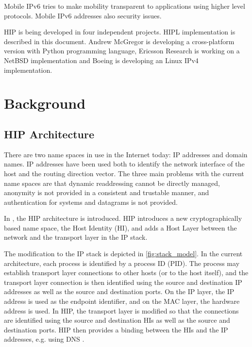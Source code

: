 Mobile IPv6 tries to make mobility transparent to applications using
higher level protocols. Mobile IPv6 \cite{rfc2002} addresses also
security issues.

HIP is being developed in four independent projects. HIPL
implementation is described in this document. Andrew McGregor is
developing a cross-platform version \cite{pyhip} with Python
programming language, Ericsson Research \cite{ericsson} is working on
a NetBSD implementation \cite{netbsd} and Boeing \cite{boeing} is
developing an Linux IPv4 implementation.

\section{Background}
\label{sec:background}

\subsection{HIP Architecture}

There are two name spaces in use in the Internet today: IP addresses
and domain names.  IP addresses have been used both to identify the
network interface of the host and the routing direction vector.  The
three main problems with the current name spaces are that dynamic
readdressing cannot be directly managed, anonymity is not provided in
a consistent and trustable manner, and authentication for systems and
datagrams is not provided.

In \cite{hiparch} , the HIP architecture is introduced. HIP introduces
a new cryptographically based name space, the Host Identity (HI), and
adds a Host Layer between the network and the transport layer in the
IP stack.

The modification to the IP stack is depicted in
\autoref{fig:stack_model}. In the current architecture, each process
is identified by a process ID (PID). The process may establish
transport layer connections to other hosts (or to the host itself),
and the transport layer connection is then identified using the source
and destination IP addresses as well as the source and destination
ports. On the IP layer, the IP address is used as the endpoint
identifier, and on the MAC layer, the hardware address is used. In
HIP, the transport layer is modified so that the connections are
identified using the source and destination HIs as well as the source
and destination ports.  HIP then provides a binding between the HIs
and the IP addresses, e.g. using DNS \cite{rfc1034}.

